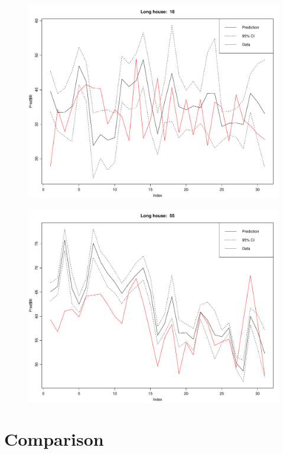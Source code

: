 \begin{figure}
    \centering
    \includegraphics[width=.8\textwidth]{../../../figures/lmpred_18L.pdf}
    \caption{}
    \label{fig: lmpred_18L}
\end{figure}
\begin{figure}
    \centering
    \includegraphics[width=.8\textwidth]{../../../figures/lmpred_55L.pdf}
    \caption{}
    \label{fig: lmpred_55L}
\end{figure}

\section{Comparison}
